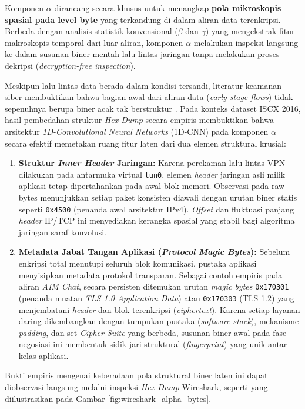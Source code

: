 Komponen $\alpha$ dirancang secara khusus untuk menangkap \textbf{pola mikroskopis spasial pada level byte} yang terkandung di dalam aliran data terenkripsi. Berbeda dengan analisis statistik konvensional ($\beta$ dan $\gamma$) yang mengekstrak fitur makroskopis temporal dari luar aliran, komponen $\alpha$ melakukan inspeksi langsung ke dalam susunan biner mentah lalu lintas jaringan tanpa melakukan proses dekripsi (\textit{decryption-free inspection}).

Meskipun lalu lintas data berada dalam kondisi tersandi, literatur keamanan siber membuktikan bahwa bagian awal dari aliran data (\textit{early-stage flows}) tidak sepenuhnya berupa biner acak tak berstruktur \citep{wang2017end, Lotfollahi2019}. Pada konteks dataset ISCX 2016, hasil pembedahan struktur \textit{Hex Dump} secara empiris membuktikan bahwa arsitektur \textit{1D-Convolutional Neural Networks} (1D-CNN) pada komponen $\alpha$ secara efektif memetakan ruang fitur laten dari dua elemen struktural krusial:
\begin{enumerate}
    \item \textbf{Struktur \textit{Inner Header} Jaringan:} Karena perekaman lalu lintas VPN dilakukan pada antarmuka virtual \texttt{tun0}, elemen \textit{header} jaringan asli milik aplikasi tetap dipertahankan pada awal blok memori. Observasi pada raw bytes menunjukkan setiap paket konsisten diawali dengan urutan biner statis seperti \texttt{0x4500} (penanda awal arsitektur IPv4). \textit{Offset} dan fluktuasi panjang \textit{header} IP/TCP ini menyediakan kerangka spasial yang stabil bagi algoritma jaringan saraf konvolusi.
    \item \textbf{Metadata Jabat Tangan Aplikasi (\textit{Protocol Magic Bytes}):} Sebelum enkripsi total menutupi seluruh blok komunikasi, pustaka aplikasi menyisipkan metadata protokol transparan. Sebagai contoh empiris pada aliran \textit{AIM Chat}, secara persisten ditemukan urutan \textit{magic bytes} \texttt{0x170301} (penanda muatan \textit{TLS 1.0 Application Data}) atau \texttt{0x170303} (TLS 1.2) yang menjembatani \textit{header} dan blok terenkripsi (\textit{ciphertext}). Karena setiap layanan daring dikembangkan dengan tumpukan pustaka (\textit{software stack}), mekanisme \textit{padding}, dan set \textit{Cipher Suite} yang berbeda, susunan biner awal pada fase negosiasi ini membentuk sidik jari struktural (\textit{fingerprint}) yang unik antar-kelas aplikasi.
\end{enumerate}

Bukti empiris mengenai keberadaan pola struktural biner laten ini dapat diobservasi langsung melalui inspeksi \textit{Hex Dump} Wireshark, seperti yang diilustrasikan pada Gambar \ref{fig:wireshark_alpha_bytes}.

